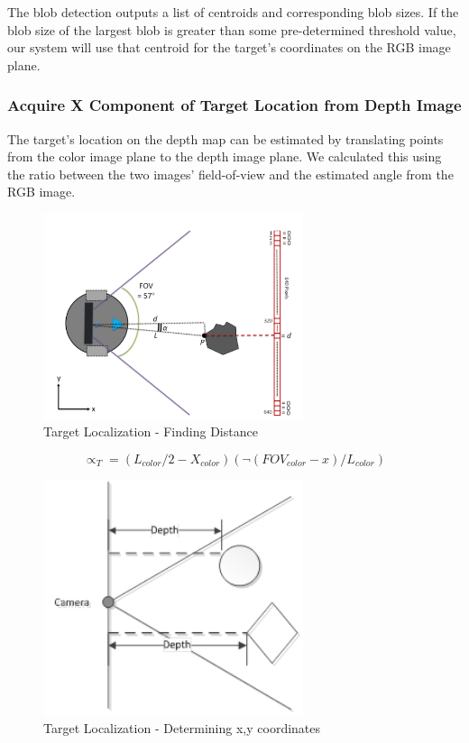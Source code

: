 \documentclass[conference]{IEEEtran}
\begin{document}
The blob detection outputs a list of centroids and corresponding blob sizes.  If the blob size of the largest blob is greater than some pre-determined threshold value, our system will use that centroid for the target’s coordinates on the RGB image plane. 


\subsubsection{Acquire X Component of Target Location from Depth Image}
The target’s location on the depth map can be estimated by translating points from the color image plane to the depth image plane.  We calculated this using the ratio between the two images’ field-of-view and the estimated angle from the RGB image.

\begin{figure}[htbp]
\begin{center}
\includegraphics[width=3in]{6}
\caption{Target Localization - Finding Distance} \label{fig:6}
\end{center}
\end{figure}

\begin{equation}
∝_T=(L_{color}/2-X_{color} )(¬(FOV_{color}-x)/L_{color} )
\end{equation}

\begin{figure}[htbp]
\begin{center}
\includegraphics[width=3in]{7}
\caption{Target Localization - Determining x,y coordinates} \label{fig:7}
\end{center}
\end{figure}
\end{document}
